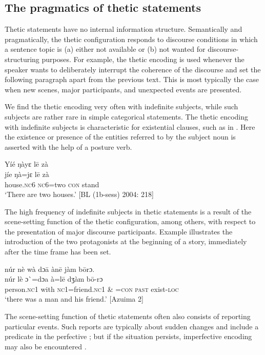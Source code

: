 \documentclass[output=paper]{langsci/langscibook}
\begin{document}
\subsection{The pragmatics of thetic statements} %

Thetic statements have no internal information structure. Semantically and pragmatically, the thetic configuration responds to discourse conditions in which a sentence topic is (a) either not available or (b) not wanted for discourse-structuring purposes. For example, the thetic encoding is used whenever the speaker wants to deliberately interrupt the coherence of the discourse and set the following paragraph apart from the previous text. This is most typically the case when new scenes, major participants, and unexpected events are presented. 

We find the thetic encoding very often with indefinite subjects, while such subjects are rather rare in simple categorical statements. The thetic encoding with indefinite subjects is characteristic for existential clauses, such as in . Here the existence or presence of the entities referred to by the subject noun is asserted with the help of a posture verb.

\ea
\glll \textup{}  Yíé    ŋàyɛ    l\={e}  zà\\
  \textup{  jíe    ŋà=jɛ    l\={e}  zà }\\
       house.\textsc{nc}6  \textsc{nc}6=two  \textsc{con}  stand\\
\glt ‘There are two houses.’ [BL (1b-sess) 2004: 218]
\z

The high frequency of indefinite subjects in thetic statements is a result of the scene-setting function of the thetic configuration, among others, with respect to the presentation of major discourse participants. Example  illustrates the introduction of the two protagonists at the beginning of a story, immediately after the time frame has been set. 

\ea
\glll \textup{}  núr    nè  wà   dɔ\={a}    àn\={e}    jàm  b\={o}rɔ.\\
  \textup{  núr    lè  }ɔ\`{ }\textup{=dɔa      à=l\={e}    dʒàm  b\={o}-rɔ}\\
       person.\textsc{nc}1  with  \textsc{nc}1=friend.\textsc{nc}1  \& =\textsc{con}  \textsc{past}  exist-\textsc{loc}\\
\glt ‘there was a man and his friend.’ [Azuima 2]
\z

The scene-setting function of thetic statements often also consists of reporting particular events. Such reports are typically about sudden changes and include a predicate in the perfective ; but if the situation persists, imperfective encoding may also be encountered .
\end{document}
